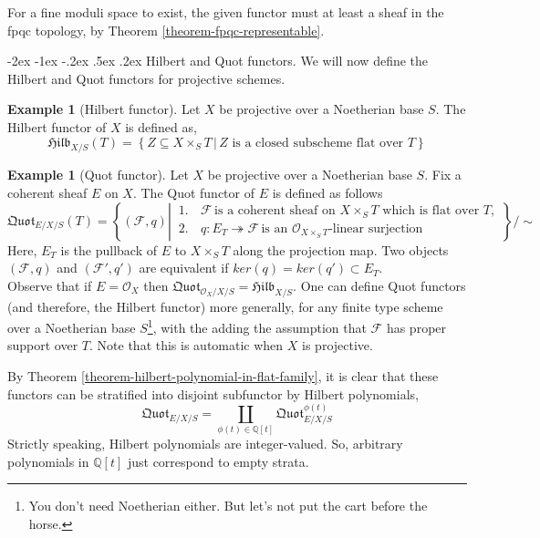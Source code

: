 \documentclass[11pt]{amsart}
\makeatletter
\renewcommand\subsection{\@startsection {subsection}{1}{\z@}%
	{-2ex \@plus -1ex \@minus -.2ex}%
	{.5ex \@plus.2ex}%
	{\normalfont\bfseries}}
\newcommand{\sF}{{\mathcal F}}
\newcommand{\sO}{{\mathcal O}}
\newcommand{\Q}{{\mathbb Q}}
\theoremstyle{definition}
\newtheorem{example}[theorem]{Example}
\makeatother
\begin{document}
For a fine moduli space to exist, the given functor must at least a sheaf in the fpqc topology, by Theorem \ref{theorem-fpqc-representable}.

\subsection{Hilbert and Quot functors.}
We will now define the Hilbert and Quot functors for projective schemes.
\begin{example}[Hilbert functor]
	Let $X$ be projective over a Noetherian base $S$. The Hilbert functor of $X$ is defined as,
	\begin{equation*}
	\mathfrak{Hilb}_{X/S}(T)=\left\{
	Z \subseteq X\times_S T \,
	\left|\,\text{$Z$ is a closed subscheme flat over $T$}\right.
	\right\}
	\end{equation*}
\end{example}

\begin{example}[Quot functor]
	Let $X$ be projective over a Noetherian base $S$. Fix a coherent sheaf $E$ on $X$. The Quot functor of $E$ is defined as follows
	\begin{equation*}
	\mathfrak{Quot}_{E/X/S}(T)=\left\{(\sF,q) \left|\,
	\begin{aligned}
	1.\, &\sF\, \text{is a coherent sheaf on $X\times_S T$ which is flat over $T$}, \\
	2.\, &q: E_T \twoheadrightarrow \sF\, \text{is an $\sO_{X\times_S T}$-linear surjection}
	\end{aligned}
	\right.\right\}\Bigg/\!\sim
	\end{equation*}
	Here, $E_T$ is the pullback of $E$ to $X\times_S T$ along the projection map. Two objects $(\sF,q)$ and $(\sF',q')$ are equivalent if $ker(q)=ker(q')\subset E_T$.\\
	Observe that if $E=\sO_X$ then $\mathfrak{Quot}_{\sO_X/X/S}=\mathfrak{Hilb}_{X/S}$. One can define Quot functors (and therefore, the Hilbert functor) more generally, for any finite type scheme over a Noetherian base $S$\footnote{You don't need Noetherian either. But let's not put the cart before the horse.}, with the adding the assumption that $\sF$ has proper support over $T$. Note that this is automatic when $X$ is projective.
\end{example}

By Theorem \ref{theorem-hilbert-polynomial-in-flat-family}, it is clear that these functors can be stratified into disjoint subfunctor by Hilbert polynomials,
\[\mathfrak{Quot}_{E/X/S}=\underset{\phi(t)\in \Q[t]}{\coprod} \mathfrak{Quot}^{\phi(t)}_{E/X/S}\]
Strictly speaking, Hilbert polynomials are integer-valued. So, arbitrary polynomials in $\Q[t]$ just correspond to empty strata.
\end{document}
